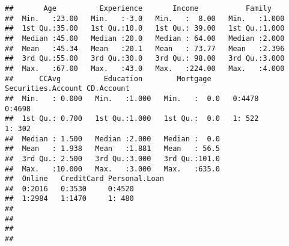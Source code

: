 \documentclass[
]{article}
\newenvironment{Shaded}{\begin{snugshade}}{\end{snugshade}}
\newcommand{\ConstantTok}[1]{\textcolor[rgb]{0.00,0.00,0.00}{#1}}
\newcommand{\FunctionTok}[1]{\textcolor[rgb]{0.00,0.00,0.00}{#1}}
\newcommand{\NormalTok}[1]{#1}
\newcommand{\OtherTok}[1]{\textcolor[rgb]{0.56,0.35,0.01}{#1}}
\newcommand{\SpecialCharTok}[1]{\textcolor[rgb]{0.00,0.00,0.00}{#1}}
\begin{document}
\begin{Shaded}
\end{Shaded}

\begin{verbatim}
##       Age          Experience       Income           Family     
##  Min.   :23.00   Min.   :-3.0   Min.   :  8.00   Min.   :1.000  
##  1st Qu.:35.00   1st Qu.:10.0   1st Qu.: 39.00   1st Qu.:1.000  
##  Median :45.00   Median :20.0   Median : 64.00   Median :2.000  
##  Mean   :45.34   Mean   :20.1   Mean   : 73.77   Mean   :2.396  
##  3rd Qu.:55.00   3rd Qu.:30.0   3rd Qu.: 98.00   3rd Qu.:3.000  
##  Max.   :67.00   Max.   :43.0   Max.   :224.00   Max.   :4.000  
##      CCAvg          Education        Mortgage     Securities.Account CD.Account
##  Min.   : 0.000   Min.   :1.000   Min.   :  0.0   0:4478             0:4698    
##  1st Qu.: 0.700   1st Qu.:1.000   1st Qu.:  0.0   1: 522             1: 302    
##  Median : 1.500   Median :2.000   Median :  0.0                                
##  Mean   : 1.938   Mean   :1.881   Mean   : 56.5                                
##  3rd Qu.: 2.500   3rd Qu.:3.000   3rd Qu.:101.0                                
##  Max.   :10.000   Max.   :3.000   Max.   :635.0                                
##  Online   CreditCard Personal.Loan
##  0:2016   0:3530     0:4520       
##  1:2984   1:1470     1: 480       
##                                   
##                                   
##                                   
## 
\end{verbatim}
\end{document}
